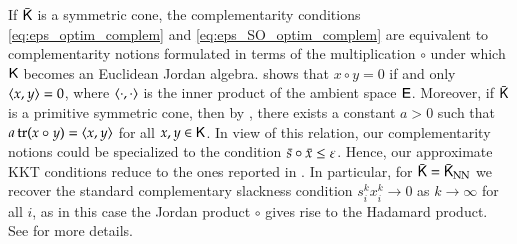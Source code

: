 \begin{remark}
If $\bar{\mathsf{K}}$ is a symmetric cone, the complementarity conditions \eqref{eq:eps_optim_complem} and \eqref{eq:eps_SO_optim_complem} are equivalent to complementarity notions formulated in terms of the multiplication $\circ$ under which $\mathsf{K}$ becomes an Euclidean Jordan algebra. \citep[][Prop. 2.1]{LouFukMas18} shows that $x\circ y=0$ if and only $\langle x,y\rangle=0$, where $\langle\cdot,\cdot\rangle$ is the inner product of the ambient space $\mathsf{E}$. Moreover, if $\bar{\mathsf{K}}$ is a primitive symmetric cone, then by \citep[][Prop. III.4.1]{FarKor94}, there exists a constant $a>0$ such that $a\operatorname{tr}(x\circ y)=\langle x,y\rangle$ for all $x,y\in\mathsf{K}$. In view of this relation, our complementarity notions could be specialized to the condition $\bar{s}\circ \bar{x}\leq \varepsilon$. Hence, our approximate KKT conditions reduce to the ones reported in \cite{AndFukHaeSanSec21}. In particular, for $\bar{\mathsf{K}}=\bar{\mathsf{K}}_{\text{NN}}$ we recover the standard complementary slackness condition $s^{k}_{i}x^{k}_{i}\to 0$ as $k\to\infty$ for all $i$, as in this case the Jordan product $\circ$ gives rise to the Hadamard product. See \cite{Andreani:2019uf} for more details.
\close
\end{remark}

